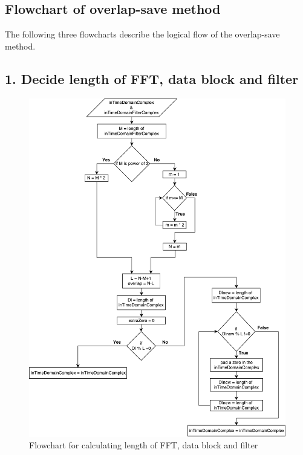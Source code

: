 \newpage
\subsection*{Flowchart of overlap-save method}
The following three flowcharts describe the logical flow of the overlap-save method.
\subsection*{1. Decide length of FFT, data block and filter}
\begin{figure}[h]
	\centering
	\includegraphics[width=13cm]{./algorithms/overlap_save/figures/overlapSave.pdf}
	\caption{Flowchart for calculating length of FFT, data block and filter}
	\label{overlapSave_length}
\end{figure}

\newpage
